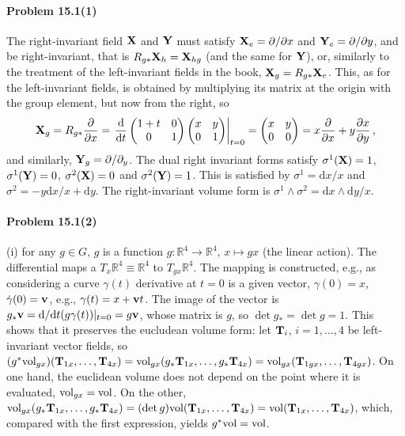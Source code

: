 \documentclass[a4paper,12pt]{article}
\def\d{\mathrm{d}}
\newcommand{\problem}[1]{\paragraph{Problem #1}}
\begin{document}
\problem{15.1(1)} The right-invariant field ${\bf X}$ and ${\bf Y}$ must satisfy ${\bf X}_e=\partial/\partial x$ and ${\bf Y}_e=\partial/\partial y$, and be right-invariant, that is $R_{g*} {\bf X}_h = {\bf X}_{hg}$ (and the same for ${\bf Y}$), or, similarly to the treatment of the left-invariant fields in the book, ${\bf X}_g = R_{g*}{\bf X}_e$. This, as for the left-invariant fields, is obtained by multiplying its matrix at the origin with the group element, but now from the right, so
\[
 {\bf X}_g = R_{g*}\frac{\partial}{\partial x} = \left.\frac{\d}{\d t}\begin{pmatrix} 1+ t & 0 \\ 0 & 1\end{pmatrix}
 \begin{pmatrix} x & y \\ 0 & 1\end{pmatrix}\right|_{t=0} = \begin{pmatrix} x & y \\ 0 & 0 \end{pmatrix} = x\frac{\partial}{\partial x}+y\frac{\partial x}{\partial y}\,,
\]
and similarly, ${\bf Y}_g = \partial/\partial_y$. The dual right invariant forms satisfy $\sigma^1({\bf X}) = 1$, $\sigma^1({\bf Y}) = 0$, $\sigma^2({\bf X}) = 0$ and $\sigma^2({\bf Y}) = 1$. This is satisfied by $\sigma^1 = \d x/x$ and $\sigma^2=-y\d x/x + \d y$. The right-invariant volume form is $\sigma^1\wedge \sigma^2=\d x\wedge \d y/x$.


\problem{15.1(2)} (i) for any $g\in G$, $g$ is a function $g:\mathbb{R}^4\to \mathbb{R}^4$, $x\mapsto gx$ (the linear action). The differential maps a $T_x \mathbb{R}^4\equiv \mathbb{R}^4$ to $T_{gx}\mathbb{R}^4$. The mapping is constructed, e.g., as considering a curve $\gamma(t)$ derivative at $t=0$ is a given vector, $\gamma(0)=x$, $\dot\gamma(0)={\bf v}$, e.g., $\gamma(t) = x+{\bf v}t$. The image of the vector is $g_* {\bf v} = \d/\d t( g \gamma(t))|_{t=0} = g{\bf v}$, whose matrix is $g$, so $\det g_* = \det g = 1$. This shows that it preserves the eucludean volume form: let ${\bf T}_i$, $i=1, \dots, 4$ be left-invariant vector fields, so $(g^* {\rm vol}_{gx})({\bf T}_{1x}, \dots, {\bf T}_{4x}) = {\rm vol}_{gx}(g_*{\bf T}_{1x}, \dots, g_*{\bf T}_{4x}) = {\rm vol}_{gx}({\bf T}_{1gx},\dots, {\bf T}_{4gx})$. On one hand, the euclidean volume does not depend on the point where it is evaluated, ${\rm vol}_{gx} = {\rm vol}$. On the other, ${\rm vol}_{gx}(g_*{\bf T}_{1x}, \dots, g_*{\bf T}_{4x}) = (\det g){\rm vol}({\bf T}_{1x},\dots, {\bf T}_{4x}) = {\rm vol}({\bf T}_{1x},\dots, {\bf T}_{4x})$, which, compared with the first expression, yields $g^*{\rm vol} = {\rm vol}$.
\end{document}
